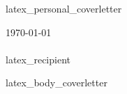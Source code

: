 \documentclass[12pt]{article}
\begin{document}

{{latex_personal_coverletter}}

\today\\
\hfill\\

{{latex_recipient}}

{{latex_body_coverletter}}
\end{document}
